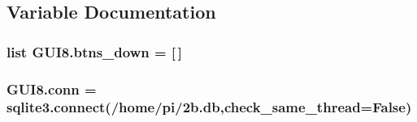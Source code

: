 \subsection{Variable Documentation}
\subsubsection[{\texorpdfstring{btns\+\_\+down}{btns_down}}]{\setlength{\rightskip}{0pt plus 5cm}list G\+U\+I8.\+btns\+\_\+down = \mbox{[}$\,$\mbox{]}}\hypertarget{namespaceGUI8_a1178839be878c3171e22a33b1a00c9c1}{}\label{namespaceGUI8_a1178839be878c3171e22a33b1a00c9c1}
\subsubsection[{\texorpdfstring{conn}{conn}}]{\setlength{\rightskip}{0pt plus 5cm}G\+U\+I8.\+conn = sqlite3.\+connect(\textquotesingle{}/home/pi/2b.\+db\textquotesingle{},check\+\_\+same\+\_\+thread=\+False)}\hypertarget{namespaceGUI8_a49010b9a16980db6e87f54580689492d}{}\label{namespaceGUI8_a49010b9a16980db6e87f54580689492d}
